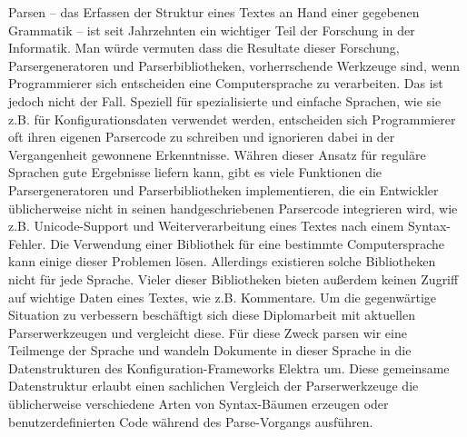 \begin{kurzfassung}
Parsen – das Erfassen der Struktur eines Textes an Hand einer gegebenen Grammatik – ist seit Jahrzehnten ein wichtiger Teil der Forschung in der Informatik. Man würde vermuten dass die Resultate dieser Forschung, Parsergeneratoren und Parserbibliotheken, vorherrschende Werkzeuge sind, wenn Programmierer sich entscheiden eine Computersprache zu verarbeiten. Das ist jedoch nicht der Fall. Speziell für spezialisierte und einfache Sprachen, wie sie z.B. für Konfigurationsdaten verwendet werden, entscheiden sich Programmierer oft ihren eigenen Parsercode zu schreiben und ignorieren dabei in der Vergangenheit gewonnene Erkenntnisse. Währen dieser Ansatz für reguläre Sprachen gute Ergebnisse liefern kann, gibt es viele Funktionen die Parsergeneratoren und Parserbibliotheken implementieren, die ein Entwickler üblicherweise nicht in seinen handgeschriebenen Parsercode integrieren wird, wie z.B. Unicode-Support und Weiterverarbeitung eines Textes nach einem Syntax-Fehler. Die Verwendung einer Bibliothek für eine bestimmte Computersprache kann einige dieser Problemen lösen. Allerdings existieren solche Bibliotheken nicht für jede Sprache. Vieler dieser Bibliotheken bieten außerdem keinen Zugriff auf wichtige Daten eines Textes, wie z.B. Kommentare. Um die gegenwärtige Situation zu verbessern beschäftigt sich diese Diplomarbeit mit aktuellen Parserwerkzeugen und vergleicht diese. Für diese Zweck parsen wir eine Teilmenge der Sprache  und wandeln Dokumente in dieser Sprache in die Datenstrukturen des Konfiguration-Frameworks Elektra um. Diese gemeinsame Datenstruktur erlaubt einen sachlichen Vergleich der Parserwerkzeuge die üblicherweise verschiedene Arten von Syntax-Bäumen erzeugen oder benutzerdefinierten Code während des Parse-Vorgangs ausführen.
\end{kurzfassung}
